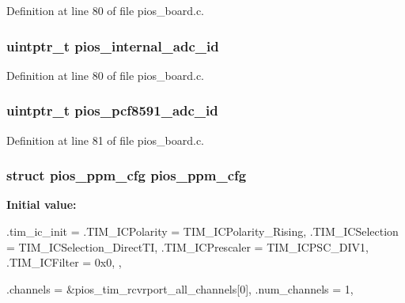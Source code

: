 \-Definition at line 80 of file pios\-\_\-board.\-c.

\hypertarget{group___copter_control_gafb354658d0ba22815d8632d97c062c0b}{
\subsubsection[{pios\-\_\-internal\-\_\-adc\-\_\-id}]{\setlength{\rightskip}{0pt plus 5cm}uintptr\-\_\-t {\bf pios\-\_\-internal\-\_\-adc\-\_\-id}}}\label{group___copter_control_gafb354658d0ba22815d8632d97c062c0b}


\-Definition at line 80 of file pios\-\_\-board.\-c.

\hypertarget{group___copter_control_gaf0cbe3f50e71a85a44444b3900a0b8b7}{
\subsubsection[{pios\-\_\-pcf8591\-\_\-adc\-\_\-id}]{\setlength{\rightskip}{0pt plus 5cm}uintptr\-\_\-t {\bf pios\-\_\-pcf8591\-\_\-adc\-\_\-id}}}\label{group___copter_control_gaf0cbe3f50e71a85a44444b3900a0b8b7}


\-Definition at line 81 of file pios\-\_\-board.\-c.

\hypertarget{group___copter_control_ga256c8c512691a72ee2ed15d1a9041810}{
\subsubsection[{pios\-\_\-ppm\-\_\-cfg}]{\setlength{\rightskip}{0pt plus 5cm}struct {\bf pios\-\_\-ppm\-\_\-cfg} {\bf pios\-\_\-ppm\-\_\-cfg}}}\label{group___copter_control_ga256c8c512691a72ee2ed15d1a9041810}
{\bfseries \-Initial value\-:}
\begin{DoxyCode}
 {
        .tim_ic_init = {
                .TIM_ICPolarity = TIM_ICPolarity_Rising,
                .TIM_ICSelection = TIM_ICSelection_DirectTI,
                .TIM_ICPrescaler = TIM_ICPSC_DIV1,
                .TIM_ICFilter = 0x0,
        },
        
        .channels = &pios_tim_rcvrport_all_channels[0],
        .num_channels = 1,
}
\end{DoxyCode}


